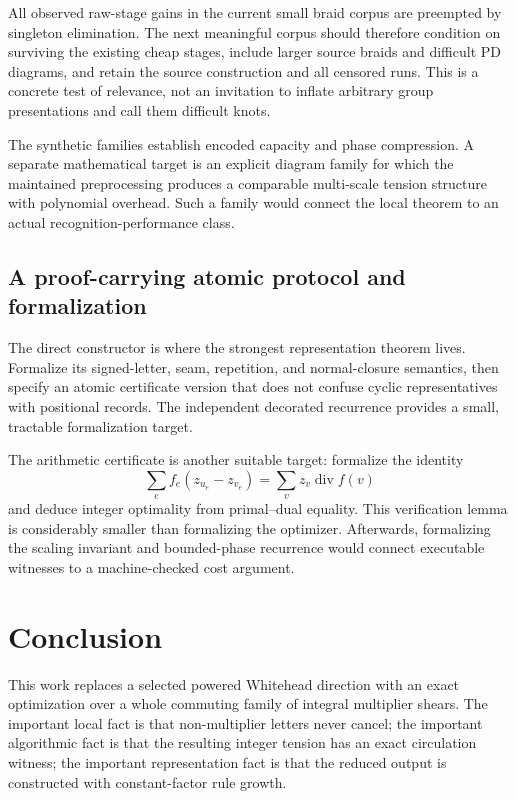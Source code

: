\documentclass[11pt,letterpaper]{article}
\theoremstyle{definition}
\theoremstyle{remark}\newtheorem{remark}[theorem]{Remark}
\newcommand{\divg}{\operatorname{div}}
\begin{document}
All observed raw-stage gains in the current small braid corpus are preempted
by singleton elimination. The next meaningful corpus should therefore
condition on surviving the existing cheap stages, include larger source
braids and difficult PD diagrams, and retain the source construction and all
censored runs. This is a concrete test of relevance, not an invitation to
inflate arbitrary group presentations and call them difficult knots.

The synthetic families establish encoded capacity and phase compression. A
separate mathematical target is an explicit diagram family for which the
maintained preprocessing produces a comparable multi-scale tension structure
with polynomial overhead. Such a family would connect the local theorem to
an actual recognition-performance class.

\subsection{A proof-carrying atomic protocol and formalization}

The direct constructor is where the strongest representation theorem lives.
Formalize its signed-letter, seam, repetition, and normal-closure semantics,
then specify an atomic certificate version that does not confuse cyclic
representatives with positional records. The independent decorated recurrence
provides a small, tractable formalization target.

The arithmetic certificate is another suitable target: formalize the identity
\[
 \sum_e f_e(z_{u_e}-z_{v_e})=\sum_vz_v\divg f(v)
\]
and deduce integer optimality from primal--dual equality. This verification
lemma is considerably smaller than formalizing the optimizer. Afterwards,
formalizing the scaling invariant and bounded-phase recurrence would connect
executable witnesses to a machine-checked cost argument.

\section{Conclusion}

This work replaces a selected powered Whitehead direction with an exact
optimization over a whole commuting family of integral multiplier shears.
The important local fact is that non-multiplier letters never cancel; the
important algorithmic fact is that the resulting integer tension has an exact
circulation witness; the important representation fact is that the reduced
output is constructed with constant-factor rule growth.
\end{document}
